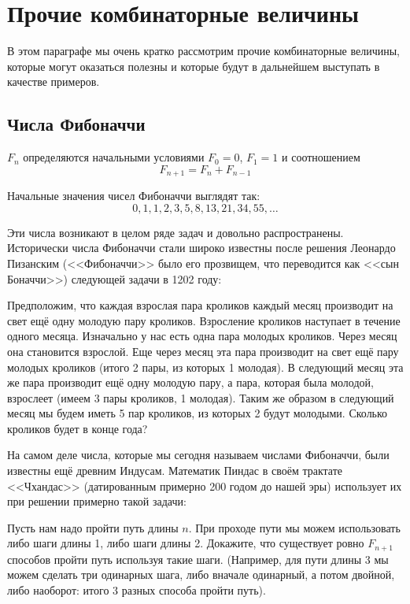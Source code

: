\section{Прочие комбинаторные величины}

В этом параграфе мы очень кратко рассмотрим прочие комбинаторные величины, которые могут оказаться полезны и которые будут в дальнейшем выступать в качестве примеров.

\subsection{Числа Фибоначчи}

\begin{definition}
 $F_n$ определяются начальными условиями $F_0 = 0$, $F_1 = 1$ и соотношением
$$F_{n+1} = F_n + F_{n-1}$$
\end{definition}

Начальные значения чисел Фибоначчи выглядят так:
$$0, 1, 1, 2, 3, 5, 8, 13, 21, 34, 55, \ldots$$

Эти числа возникают в целом ряде задач и довольно распространены. Исторически числа Фибоначчи стали широко известны после решения Леонардо Пизанским (<<Фибоначчи>>  было его прозвищем, что переводится как <<сын Боначчи>>) следующей задачи в 1202 году:

\begin{exercise}
Предположим, что каждая взрослая пара кроликов каждый месяц производит на свет ещё одну молодую пару кроликов. Взросление кроликов наступает в течение одного месяца. Изначально у нас есть одна пара молодых кроликов. Через месяц она становится взрослой. Еще через месяц эта пара производит на свет ещё пару молодых кроликов (итого 2 пары, из которых 1 молодая). В следующий месяц эта же пара производит ещё одну молодую пару, а пара, которая была молодой, взрослеет (имеем 3 пары кроликов, 1 молодая). Таким же образом в следующий месяц мы будем иметь 5 пар кроликов, из которых 2 будут молодыми. Сколько кроликов будет в конце года?
\end{exercise}

На самом деле числа, которые мы сегодня называем числами Фибоначчи, были известны ещё древним Индусам. Математик Пиндас в своём трактате <<Чхандас>> (датированным примерно 200 годом до нашей эры) использует их при решении примерно такой задачи:

\begin{exercise}
Пусть нам надо пройти путь длины $n$. При проходе пути мы можем использовать либо шаги длины 1, либо шаги длины 2. Докажите, что существует ровно $F_{n+1}$ способов пройти путь используя такие шаги. (Например, для пути длины 3 мы можем сделать три одинарных шага, либо вначале одинарный, а потом двойной, либо наоборот: итого 3 разных способа пройти путь).
\end{exercise}

